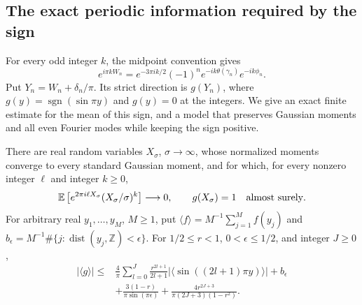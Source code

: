 \subsection{The exact periodic information required by the sign}
For every odd integer $k$, the midpoint convention gives
\[
 e^{i\pi kW_n}
 =e^{-3\pi ik/2}(-1)^n
       e^{-ik\theta(\gamma_n)}e^{-ik\phi_n}.
\]
Put $Y_n=W_n+\delta_n/\pi$. Its strict direction is
$g(Y_n)$, where $g(y)=\operatorname{sgn}(\sin\pi y)$ and
$g(y)=0$ at the integers. We give an exact finite estimate for the
mean of this sign, and a model that preserves Gaussian moments and
all even Fourier modes while keeping the sign positive.

\begin{proposition}
\label{prop:periodic-gaussian-gate}
There are real random variables $X_\sigma$, $\sigma\to\infty$,
whose normalized moments converge to every standard Gaussian moment,
and for which, for every nonzero integer $\ell$ and integer $k\ge0$,
\[
 \mathbb E\left[e^{2\pi i\ell X_\sigma}
                     (X_\sigma/\sigma)^k\right]\longrightarrow0,
 \qquad g(X_\sigma)=1\quad\hbox{almost surely}.
\]
For arbitrary real $y_1,\ldots,y_M$, $M\ge1$, put
$\langle f\rangle=M^{-1}\sum_{j=1}^M f(y_j)$ and
$b_\epsilon=M^{-1}\#\{j:\operatorname{dist}(y_j,\mathbb Z)<\epsilon\}$.
For $1/2\le r<1$, $0<\epsilon\le1/2$, and integer $J\ge0$,
\begin{align*}
 |\langle g\rangle|
 \le{}&\frac4\pi\sum_{l=0}^J
      \frac{r^{2l+1}}{2l+1}
       |\langle\sin((2l+1)\pi y)\rangle|+b_\epsilon\\
 &+\frac{3(1-r)}{\pi\sin(\pi\epsilon)}
 +\frac{4r^{2J+3}}{\pi(2J+3)(1-r^2)}.
\end{align*}
\end{proposition}
